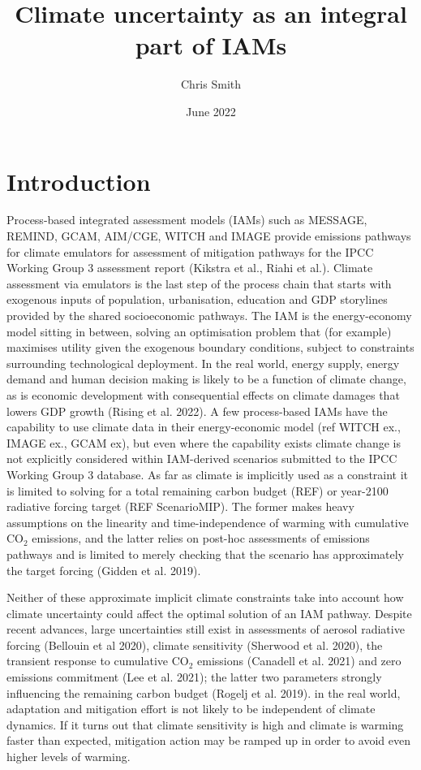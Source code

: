 \documentclass{article}
\title{Climate uncertainty as an integral part of IAMs}
\author{Chris Smith}
\date{June 2022}
\begin{document}
\maketitle

\section{Introduction}

Process-based integrated assessment models (IAMs) such as MESSAGE, REMIND, GCAM, AIM/CGE, WITCH and IMAGE provide emissions pathways for climate emulators for assessment of mitigation pathways for the IPCC Working Group 3 assessment report (Kikstra et al., Riahi et al.). Climate assessment via emulators is the last step of the process chain that starts with exogenous inputs of population, urbanisation, education and GDP storylines provided by the shared socioeconomic pathways. The IAM is the energy-economy model sitting in between, solving an optimisation problem that (for example) maximises utility given the exogenous boundary conditions, subject to constraints surrounding technological deployment. In the real world, energy supply, energy demand and human decision making is likely to be a function of climate change, as is economic development with consequential effects on climate damages that lowers GDP growth (Rising et al. 2022). A few process-based IAMs have the capability to use climate data in their energy-economic model (ref WITCH ex., IMAGE ex., GCAM ex), but even where the capability exists climate change is not explicitly considered within IAM-derived scenarios submitted to the IPCC Working Group 3 database. As far as climate is implicitly used as a constraint it is limited to solving for a total remaining carbon budget (REF) or year-2100 radiative forcing target (REF ScenarioMIP). The former makes heavy assumptions on the linearity and time-independence of warming with cumulative CO$_2$ emissions, and the latter relies on post-hoc assessments of emissions pathways and is limited to merely checking that the scenario  has approximately the target forcing (Gidden et al. 2019). 

Neither of these approximate implicit climate constraints take into account how climate uncertainty could affect the optimal solution of an IAM pathway. Despite recent advances, large uncertainties still exist in assessments of aerosol radiative forcing (Bellouin et al 2020), climate sensitivity (Sherwood et al. 2020), the transient response to cumulative CO$_2$ emissions (Canadell et al. 2021) and zero emissions commitment (Lee et al. 2021); the latter two parameters strongly influencing the remaining carbon budget (Rogelj et al. 2019). in the real world, adaptation and mitigation effort is not likely to be independent of climate dynamics. If it turns out that climate sensitivity is high and climate is warming faster than expected, mitigation action may be ramped up in order to avoid even higher levels of warming.
\end{document}
